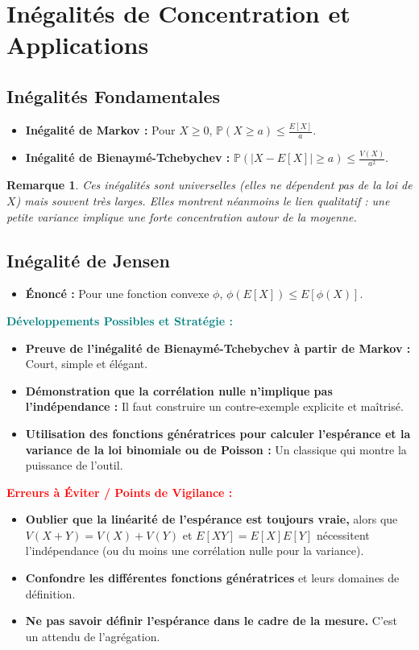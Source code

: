 \documentclass[12pt, a4paper, parskip=full]{report}
\theoremstyle{agregstyle}
\newtheorem{remark}[definition]{Remarque}
\newenvironment{developpements}
  {\par\medskip\noindent\begin{oframed}\noindent\textbf{\textcolor{teal}{Développements Possibles et Stratégie :}}}
  {\end{oframed}\par\medskip}
\newenvironment{erreurs}
  {\par\medskip\noindent\begin{oframed}\noindent\textbf{\textcolor{red}{Erreurs à Éviter / Points de Vigilance :}}}
  {\end{oframed}\par\medskip}
\begin{document}
\section{Inégalités de Concentration et Applications}
\subsection{Inégalités Fondamentales}
\begin{itemize}
    \item \textbf{Inégalité de Markov :} Pour $X \ge 0$, $\mathbb{P}(X \ge a) \le \frac{E[X]}{a}$.
    \item \textbf{Inégalité de Bienaymé-Tchebychev :} $\mathbb{P}(|X-E[X]| \ge a) \le \frac{V(X)}{a^2}$.
\end{itemize}
\begin{remark}
    Ces inégalités sont universelles (elles ne dépendent pas de la loi de $X$) mais souvent très larges. Elles montrent néanmoins le lien qualitatif : une petite variance implique une forte concentration autour de la moyenne.
\end{remark}
\subsection{Inégalité de Jensen}
\begin{itemize}
    \item \textbf{Énoncé :} Pour une fonction convexe $\phi$, $\phi(E[X]) \le E[\phi(X)]$.
\end{itemize}

\begin{developpements}
    \begin{itemize}
        \item \textbf{Preuve de l'inégalité de Bienaymé-Tchebychev à partir de Markov :} Court, simple et élégant.
        \item \textbf{Démonstration que la corrélation nulle n'implique pas l'indépendance :} Il faut construire un contre-exemple explicite et maîtrisé.
        \item \textbf{Utilisation des fonctions génératrices pour calculer l'espérance et la variance de la loi binomiale ou de Poisson :} Un classique qui montre la puissance de l'outil.
    \end{itemize}
\end{developpements}

\begin{erreurs}
    \begin{itemize}
        \item \textbf{Oublier que la linéarité de l'espérance est toujours vraie,} alors que $V(X+Y)=V(X)+V(Y)$ et $E[XY]=E[X]E[Y]$ nécessitent l'indépendance (ou du moins une corrélation nulle pour la variance).
        \item \textbf{Confondre les différentes fonctions génératrices} et leurs domaines de définition.
        \item \textbf{Ne pas savoir définir l'espérance dans le cadre de la mesure.} C'est un attendu de l'agrégation.
    \end{itemize}
\end{erreurs}
\end{document}
